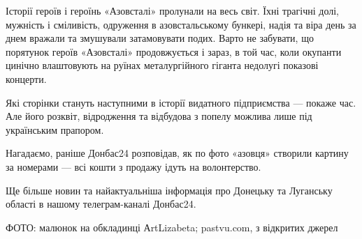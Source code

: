 Історії героїв і героїнь «Азовсталі» пролунали на весь світ. Їхні трагічні
долі, мужність і сміливість, одруження в азовстальському бункері, надія та віра
день за днем вражали та змушували затамовувати подих. Варто не забувати, що
порятунок героїв «Азовсталі» продовжується і зараз, в той час, коли окупанти
цинічно влаштовують на руїнах металургійного гіганта недолугі показові
концерти. 

Які сторінки стануть наступними в історії видатного підприємства — покаже час.
Але його розквіт, відродження та відбудова з попелу можлива лише під
українським прапором.

Нагадаємо, раніше Донбас24 розповідав, як по фото «азовця» створили картину за
номерами — всі кошти з продажу ідуть на волонтерство.

Ще більше новин та найактуальніша інформація про Донецьку та Луганську області
в нашому телеграм-каналі Донбас24.

ФОТО: малюнок на обкладинці АrtLizabeta; pastvu.com, з відкритих джерел
